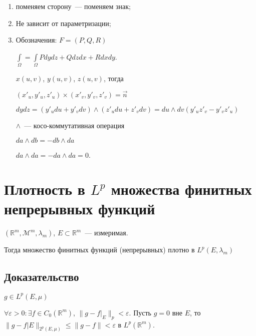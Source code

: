 \documentclass{article}
\begin{document}
            \begin{enumerate}
        
                \item поменяем сторону~--- поменяем знак;
                
                \item Не зависит от параметризации;
                
                \item Обозначения: $F = (P, Q, R)$
                
                    $\int\limits_{\Omega} = \int\limits_{\Omega} P dy dz + Q dz dx + R dx dy$.
                
                    $x(u, v)$, $y(u, v)$, $z(u, v)$, тогда
                    
                    $(x'_u, y'_u, z'_u) \times (x'_v, y'_v, z'_v) = \vec{n}$
                
                    $dy dz = (y'_u du + y'_v dv) \wedge (z'_u du + z'_v dv) = du \wedge dv (y'_u z'_v - y'_v z'_u)$
                    
                    $\wedge$~--- косо-коммутативная операция
                    
                    $da \wedge db = -db \wedge da$
                    
                    $da \wedge da = -da \wedge da = 0$.
                    
            \end{enumerate}
     
    \newpage
    
    \section{Плотность в $L^p$ множества финитных непрерывных функций}
    
        $\left( \mathbb{R}^m, \mathcal{M}^m, \lambda_m \right)$, $E \subset \mathbb{R}^m$~--- измеримая.
        
        Тогда множество финитных функций (непрерывных) плотно в $L^p \left( E, \lambda_m \right)$
            
        \subsection{Доказательство}
        
            $g \in L^p(E, \mu)$
            
            $\forall \varepsilon > 0 : \exists f \in C_0 \left( \mathbb{R}^m \right)$, $\| g - f \big|_E \|_p < \varepsilon$. Пусть $g = 0$ вне $E$, то $\| g - f \big|E \|_{2^p(E, \mu)} \leqslant \| g - f \| < \varepsilon$ в $L^p \left( \mathbb{R}^m \right)$.
            
\end{document}

